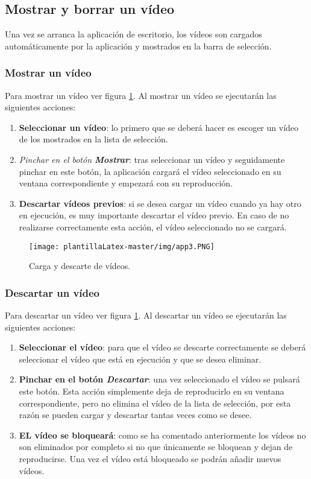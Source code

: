 \subsection{Mostrar y borrar un vídeo}
Una vez se arranca la aplicación de escritorio, los vídeos son cargados automáticamente por la aplicación y mostrados en la barra de selección. 

\subsubsection{Mostrar un vídeo}
Para mostrar un vídeo ver figura \ref{fig:app3}. Al mostrar un vídeo se ejecutarán las siguientes acciones:
\begin{enumerate}
    \item \textbf{Seleccionar un vídeo}: lo primero que se deberá hacer es escoger un vídeo de los mostrados en la lista de selección.
    \item \textit{Pinchar en el botón \textbf{Mostrar}}: tras seleccionar un vídeo y seguidamente pinchar en este botón, la aplicación cargará el vídeo seleccionado en su ventana correspondiente y empezará con su reproducción. 
    \item \textbf{Descartar vídeos previos}: si se desea cargar un vídeo cuando ya hay otro en ejecución, es muy importante descartar el vídeo previo. En caso de no realizarse correctamente esta acción, el vídeo seleccionado no se cargará.
\end{enumerate}

\begin{figure}[H]
    \centering
    \texttt{[image: plantillaLatex-master/img/app3.PNG]}
    \caption{Carga y descarte de vídeos.}
    \label{fig:app3}
\end{figure}

\subsubsection{Descartar un vídeo}
Para descartar un vídeo ver figura \ref{fig:app3}. Al descartar un vídeo se ejecutarán las siguientes acciones:
\begin{enumerate}
    \item \textbf{Seleccionar el vídeo}: para que el vídeo se descarte correctamente se deberá seleccionar el vídeo que está en ejecución y que se desea eliminar. 
    \item \textbf{Pinchar en el botón \textit{Descartar}}: una vez seleccionado el vídeo se pulsará este botón. Esta acción simplemente deja de reproducirlo en su ventana correspondiente, pero no elimina el vídeo de la lista de selección,
    por esta razón se pueden cargar y descartar tantas veces como se desee.
    \item \textbf{EL vídeo se bloqueará}: como se ha comentado anteriormente los vídeos no son eliminados por completo si no que únicamente se bloquean y dejan de reproducirse. Una vez el vídeo está bloqueado se podrán añadir nuevos vídeos.
\end{enumerate}


